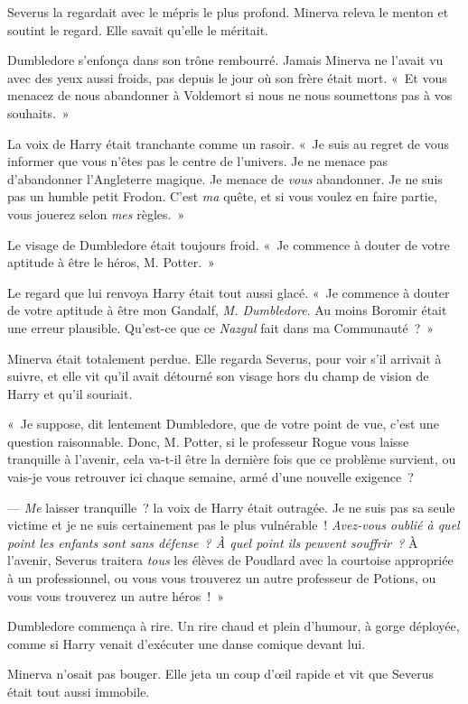 Severus la regardait avec le mépris le plus profond.
Minerva releva le menton et soutint le regard.
Elle savait qu'elle le méritait.

Dumbledore s'enfonça dans son trône rembourré.
Jamais Minerva ne l'avait vu avec des yeux aussi froids, pas depuis le jour où son frère était mort.
«~Et vous menacez de nous abandonner à Voldemort si nous ne nous soumettons pas à vos souhaits.~»

La voix de Harry était tranchante comme un rasoir.
«~Je suis au regret de vous informer que vous n'êtes pas le centre de l'univers.
Je ne menace pas d'abandonner l'Angleterre magique.
Je menace de \emph{vous} abandonner.
Je ne suis pas un humble petit Frodon.
C'est \emph{ma} quête, et si vous voulez en faire partie, vous jouerez selon \emph{mes} règles.~»

Le visage de Dumbledore était toujours froid.
«~Je commence à douter de votre aptitude à être le héros, M. Potter.~»

Le regard que lui renvoya Harry était tout aussi glacé.
«~Je commence à douter de votre aptitude à être mon Gandalf, \emph{M. Dumbledore}.
Au moins Boromir était une erreur plausible.
Qu'est-ce que ce \emph{Nazgul} fait dans ma Communauté~?~»

Minerva était totalement perdue.
Elle regarda Severus, pour voir s'il arrivait à suivre, et elle vit qu'il avait détourné son visage hors du champ de vision de Harry et qu'il souriait.

«~Je suppose, dit lentement Dumbledore, que de votre point de vue, c'est une question raisonnable.
Donc, M. Potter, si le professeur Rogue vous laisse tranquille à l'avenir, cela va-t-il être la dernière fois que ce problème survient, ou vais-je vous retrouver ici chaque semaine, armé d'une nouvelle exigence~?

--- \emph{Me} laisser tranquille~? la voix de Harry était outragée.
Je ne suis pas sa seule victime et je ne suis certainement pas le plus vulnérable~!
\emph{Avez-vous oublié à quel point les enfants sont sans défense~?
À quel point ils peuvent souffrir~?} À l'avenir, Severus traitera \emph{tous} les élèves de Poudlard avec la courtoise appropriée à un professionnel, ou vous vous trouverez un autre professeur de Potions, ou vous vous trouverez un autre héros~!~»

Dumbledore commença à rire.
Un rire chaud et plein d'humour, à gorge déployée, comme si Harry venait d'exécuter une danse comique devant lui.

Minerva n'osait pas bouger.
Elle jeta un coup d'œil rapide et vit que Severus était tout aussi immobile.

